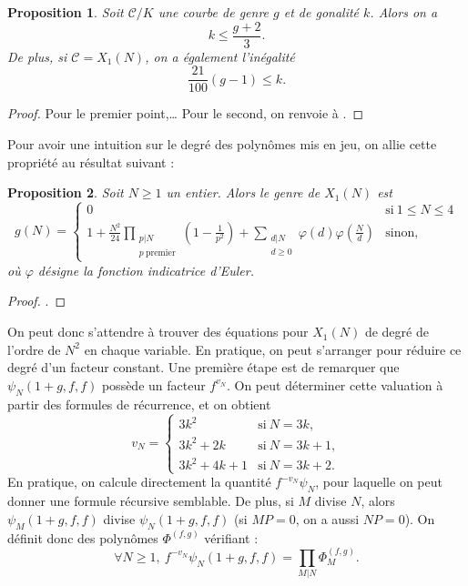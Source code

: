 \documentclass[11pt,a4paper]{article}
\newcommand{\Cl}{\mathcal{C}}
\newtheorem*{prop}{Proposition}
\theoremstyle{definition}
\begin{document}
\begin{prop}
Soit $\Cl/K$ une courbe de genre $g$ et de gonalité $k$. Alors on a
$$k\leq \frac{g+2}{3}.$$
De plus, si $\Cl = X_1(N)$, on a également l'inégalité
$$\frac{21}{100}(g-1)\leq k.$$
\end{prop}

\begin{proof} Pour le premier point,\ldots
Pour le second, on renvoie à \cite{gon}.
\end{proof}


Pour avoir une intuition sur le degré des polynômes mis en jeu, on allie cette propriété au résultat suivant :

\begin{prop}
Soit $N\geq 1$ un entier. Alors le genre de $X_1(N)$ est 
$$  g(N) = 
\begin{cases}
0 &\text{si}\ 1\leq N\leq 4 \\
\displaystyle 1 + \frac{N^2}{24} \prod_{\substack{p|N \\ p\ \mathrm{premier}}} \left(1 - \frac{1}{p^2}\right) + \sum_{\substack{d|N\\ d\geq 0}} \varphi(d)\varphi\left(\frac{N}{d}\right)& \text{sinon,}
\end{cases}$$
où $\varphi$ désigne la fonction indicatrice d'Euler.
\end{prop}

\begin{proof}
\cite{Coreens}.
\end{proof}

On peut donc s'attendre à trouver des équations pour $X_1(N)$ de degré de l'ordre de $N^2$ en chaque variable. En pratique, on peut s'arranger pour réduire ce degré d'un facteur constant. Une première étape est de remarquer que $\psi_N(1+g, f, f)$ possède un facteur $f^{v_N}.$ On peut déterminer cette valuation à partir des formules de récurrence, et on obtient
$$ v_N =
\begin{cases}
3k^2 & \text{si}\ N = 3k, \\
3k^2 + 2k &\text{si}\ N = 3k+1, \\
3k^2 + 4k + 1 &\text{si}\ N = 3k+2.
\end{cases}$$
En pratique, on calcule directement la quantité $f^{-v_N}\psi_N$, pour laquelle on peut donner une formule récursive semblable. De plus, si $M$ divise $N$, alors $\psi_M(1+g, f, f)$ divise $\psi_N(1+g, f, f)$ (si $MP = 0$, on a aussi $NP = 0$). On définit donc des polynômes $\Phi^{(f, g)}$ vérifiant :
$$\forall N\geq 1,\ f^{-v_N} \psi_N(1+g, f, f) = \prod_{M | N} \Phi_M^{(f, g)}.$$
\end{document}

